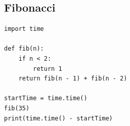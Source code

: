 \documentclass[a4paper, 12p]{book}
\begin{document}
\subsection{Fibonacci}

\begin{lstlisting}
import time

def fib(n):
    if n < 2:
        return 1
    return fib(n - 1) + fib(n - 2)

startTime = time.time()
fib(35)
print(time.time() - startTime)
\end{lstlisting}

\newpage %

\clearpage
{}


\end{document}
